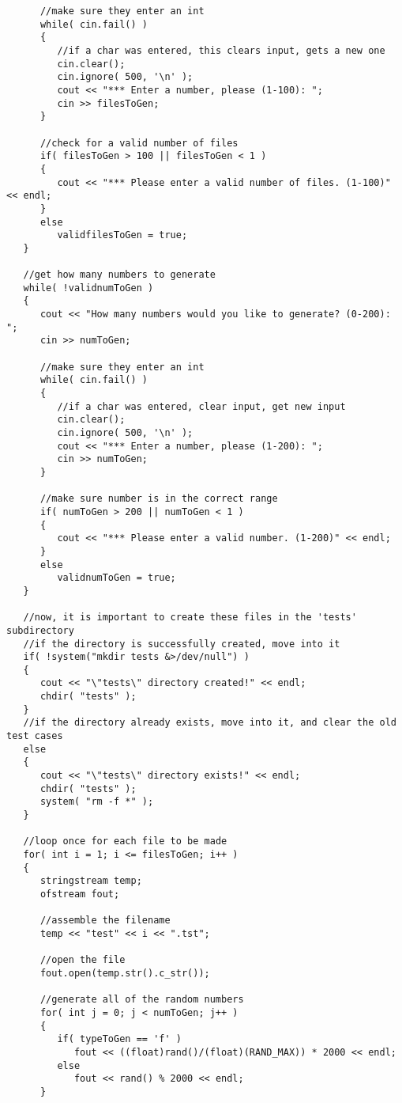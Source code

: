 \begin{lstlisting}
      //make sure they enter an int
      while( cin.fail() )
      {
         //if a char was entered, this clears input, gets a new one
         cin.clear();
         cin.ignore( 500, '\n' );
         cout << "*** Enter a number, please (1-100): ";
         cin >> filesToGen;
      }
      
      //check for a valid number of files
      if( filesToGen > 100 || filesToGen < 1 )
      {
         cout << "*** Please enter a valid number of files. (1-100)" << endl;
      }
      else
         validfilesToGen = true;
   }
      
   //get how many numbers to generate
   while( !validnumToGen )
   {
      cout << "How many numbers would you like to generate? (0-200): ";
      cin >> numToGen;
      
      //make sure they enter an int
      while( cin.fail() )
      {
         //if a char was entered, clear input, get new input
         cin.clear();
         cin.ignore( 500, '\n' );
         cout << "*** Enter a number, please (1-200): ";
         cin >> numToGen;
      }

      //make sure number is in the correct range
      if( numToGen > 200 || numToGen < 1 )
      {
         cout << "*** Please enter a valid number. (1-200)" << endl;
      }
      else
         validnumToGen = true;
   }
   
   //now, it is important to create these files in the 'tests' subdirectory
   //if the directory is successfully created, move into it
   if( !system("mkdir tests &>/dev/null") )
   {
      cout << "\"tests\" directory created!" << endl;
      chdir( "tests" );
   }   
   //if the directory already exists, move into it, and clear the old test cases
   else
   {
      cout << "\"tests\" directory exists!" << endl;
      chdir( "tests" );
      system( "rm -f *" );
   }   
   
   //loop once for each file to be made
   for( int i = 1; i <= filesToGen; i++ )
   {
      stringstream temp;
      ofstream fout;
      
      //assemble the filename
      temp << "test" << i << ".tst";
      
      //open the file
      fout.open(temp.str().c_str());
      
      //generate all of the random numbers
      for( int j = 0; j < numToGen; j++ )
      {
         if( typeToGen == 'f' )
            fout << ((float)rand()/(float)(RAND_MAX)) * 2000 << endl;
         else
            fout << rand() % 2000 << endl;
      }
      

\end{lstlisting}
